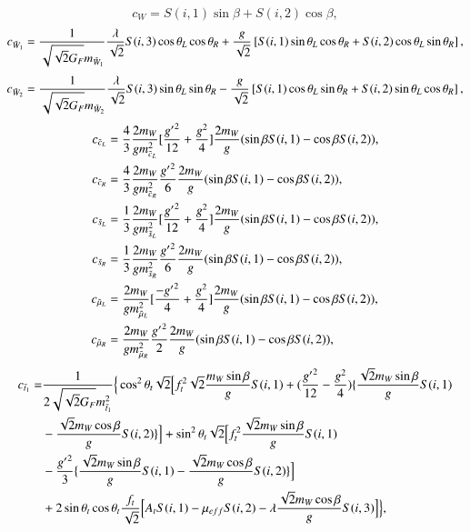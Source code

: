 \documentclass[final,3p,times]{elsarticle}
\begin{document}
\begin{equation}
c_{W} = S(i,1)\sin\beta + S(i,2)\cos\beta,
\end{equation}
\begin{equation}
c_{\tilde{W}_1} = {1 \over \sqrt{\sqrt{2} G_{F}} m_{\tilde{W}_1}}{\lambda \over \sqrt{2}}S(i,3)\cos\theta_L \cos\theta_R + {g \over \sqrt{2}}\left[S(i,1)\sin\theta_L \cos\theta_R + S(i,2) \cos\theta_L \sin\theta_R\right],
\end{equation}
\begin{equation}
c_{\tilde{W}_2} = {1 \over \sqrt{\sqrt{2} G_{F}} m_{\tilde{W}_2}}{\lambda \over \sqrt{2}}S(i,3)\sin\theta_L \sin\theta_R - {g \over \sqrt{2}}\left[S(i,1)\cos\theta_L \sin\theta_R + S(i,2) \sin\theta_L \cos\theta_R\right],
\end{equation}
\begin{align}
c_{\tilde{c}_L} &= {4 \over 3} {2 m_{W} \over g m_{\tilde{c}_L}^2} [{{g'}^2 \over 12} + {g^2 \over 4}]{2 m_{W} \over g}(\sin\beta S(i,1) - \cos\beta S(i,2)),  \\
c_{\tilde{c}_R} &= {4 \over 3} {2 m_{W} \over g m_{\tilde{c}_R}^2} {{g'}^2 \over 6}{2 m_{W} \over g}(\sin\beta S(i,1) - \cos\beta S(i,2)), \\
c_{\tilde{s}_L} &= {1 \over 3} {2 m_{W} \over g m_{\tilde{s}_L}^2} [{{g'}^2 \over 12} + {g^2 \over 4}]{2 m_{W} \over g}(\sin\beta S(i,1) - \cos\beta S(i,2)),  \\
c_{\tilde{s}_R} &= {1 \over 3} {2 m_{W} \over g m_{\tilde{s}_R}^2} {{g'}^2 \over 6}{2 m_{W} \over g}(\sin\beta S(i,1) - \cos\beta S(i,2)), \\
c_{\tilde{\mu}_L} &= {2 m_{W} \over g m_{\tilde{\mu}_L}^2} [{-{g'}^2 \over 4} + {g^2 \over 4}]{2 m_{W} \over g}(\sin\beta S(i,1) - \cos\beta S(i,2)),  \\
c_{\tilde{\mu}_R} &= {2 m_{W} \over g m_{\tilde{\mu}_R}^2} {{g'}^2 \over 2}{2 m_{W} \over g}(\sin\beta S(i,1) - \cos\beta S(i,2)),
\end{align}
\begin{equation}
\begin{aligned}
c_{\tilde{t}_1} = & {1 \over 2\sqrt{\sqrt{2}G_{F}} m_{\tilde{t}_1}^2}\Big\{\cos^2 \theta_t \sqrt{2}\Big[f_{t}^2 \sqrt{2} {m_{W} \sin\beta \over g} S(i,1) + ({{g'}^2 \over 12} - {g^2 \over 4}) \{{\sqrt{2} m_{W} \sin\beta \over g} S(i,1)  \\ & -{\sqrt{2} m_{W} \cos\beta \over g}S(i,2)\}\Big] + \sin^2 \theta_t \sqrt{2} \Big[ f_{t}^2 {\sqrt{2} m_{W} \sin\beta \over g}S(i,1) \\ & - {{g'}^2 \over 3}\{{\sqrt{2} m_{W} \sin\beta \over g}S(i,1) - {\sqrt{2} m_{W} \cos\beta \over g} S(i,2)\}\Big] \\ & + 2\sin\theta_t \cos\theta_t {f_{t} \over \sqrt{2}}\Big[A_{t}S(i,1) - \mu_{eff}S(i,2) - \lambda {\sqrt{2} m_{W} \cos\beta \over g}S(i,3)\Big]\Big\},
\end{aligned}
\end{equation}
\end{document}
